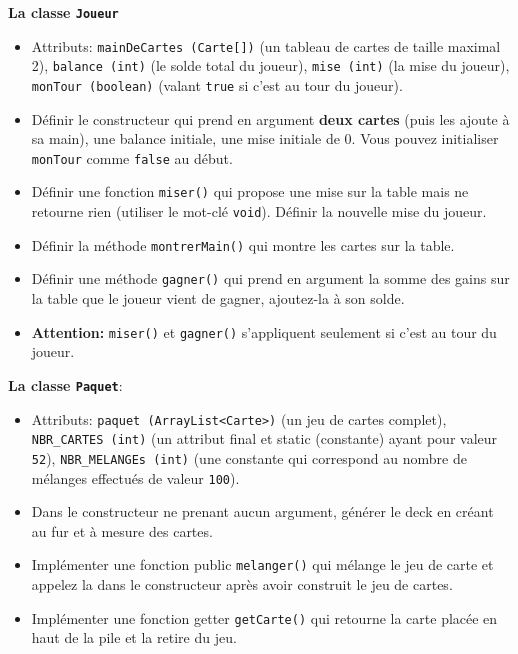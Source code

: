 \begin{Exercice}[15 minutes]
    
    \textbf{La classe \lstinline{Joueur}}
    \begin{itemize}
        \item Attributs: \lstinline{mainDeCartes (Carte[])} (un tableau de cartes de taille maximal 2), \lstinline{balance (int)} (le solde total du joueur), \lstinline{mise (int)} (la mise du joueur), \lstinline{monTour (boolean)} (valant \lstinline{true} si c’est au tour du joueur).
        \item Définir le constructeur qui prend en argument \textbf{deux cartes} (puis les ajoute à sa main), une balance initiale, une mise initiale de 0. Vous pouvez initialiser \lstinline{monTour} comme \lstinline{false} au début.
        \item Définir une fonction \lstinline{miser()} qui propose une mise sur la table mais ne retourne rien (utiliser le mot-clé \lstinline{void}). Définir la nouvelle mise du joueur.
        \item Définir la méthode \lstinline{montrerMain()} qui montre les cartes sur la table.
        \item Définir une méthode \lstinline{gagner()} qui prend en argument la somme des gains sur la table que le joueur vient de gagner, ajoutez-la à son solde.
        \item \textbf{Attention:} \lstinline{miser()} et \lstinline{gagner()} s'appliquent seulement si c’est au tour du joueur.
    \end{itemize}
    
    
    \textbf{La classe \lstinline{Paquet}}:
    \begin{itemize}
        \item Attributs: \lstinline{paquet (ArrayList<Carte>)} (un jeu de cartes complet), \lstinline{NBR_CARTES (int)} (un attribut final et static (constante) ayant pour valeur \lstinline{52}), \lstinline{NBR_MELANGEs (int)} (une constante qui correspond au nombre de mélanges effectués de valeur \lstinline{100}).
        \item Dans le constructeur ne prenant aucun argument, générer le deck en créant au fur et à mesure des cartes. 
        \item Implémenter une fonction public \lstinline{melanger()} qui mélange le jeu de carte et appelez la dans le constructeur après avoir construit le jeu de cartes.
        \item Implémenter une fonction getter \lstinline{getCarte()} qui retourne la carte placée en haut de la pile et la retire du jeu.
    \end{itemize}
    \begin{conseil}


\end{conseil}
\end{Exercice}
